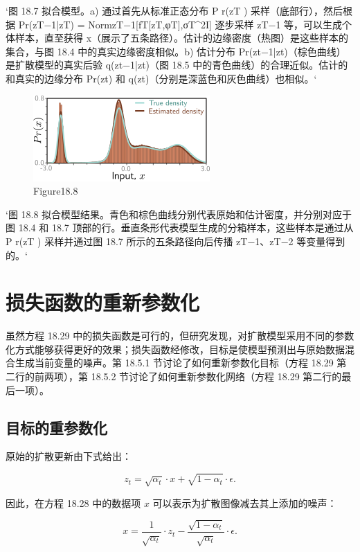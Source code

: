 `图 18.7 拟合模型。a) 通过首先从标准正态分布 P r(zT ) 采样（底部行），然后根据 Pr(zT−1|zT) = NormzT−1[fT[zT,φT],σT^2I] 逐步采样 zT−1 等，可以生成个体样本，直至获得 x（展示了五条路径）。估计的边缘密度（热图）是这些样本的集合，与图 18.4 中的真实边缘密度相似。b) 估计分布 Pr(zt−1|zt)（棕色曲线）是扩散模型的真实后验 q(zt−1|zt)（图 18.5 中的青色曲线）的合理近似。估计的和真实的边缘分布 Pr(zt) 和 q(zt)（分别是深蓝色和灰色曲线）也相似。`

\begin{figure}[h!]
\centering
\includegraphics[width=0.7\linewidth]{png/chapter18/DiffusionResultsFinal.png}
\caption{Figure18.8}
\end{figure}

`图 18.8 拟合模型结果。青色和棕色曲线分别代表原始和估计密度，并分别对应于图 18.4 和 18.7 顶部的行。垂直条形代表模型生成的分箱样本，这些样本是通过从 P r(zT ) 采样并通过图 18.7 所示的五条路径向后传播 zT−1、zT−2 等变量得到的。`

\section{损失函数的重新参数化}
虽然方程 18.29 中的损失函数是可行的，但研究发现，对扩散模型采用不同的参数化方式能够获得更好的效果；损失函数经修改，目标是使模型预测出与原始数据混合生成当前变量的噪声。第 18.5.1 节讨论了如何重新参数化目标（方程 18.29 第二行的前两项），第 18.5.2 节讨论了如何重新参数化网络（方程 18.29 第二行的最后一项）。


\subsection{目标的重参数化}
原始的扩散更新由下式给出：

\[
z_t = \sqrt{\alpha_t} \cdot x + \sqrt{1 - \alpha_t} \cdot \epsilon. \tag{18.30}
\]

因此，在方程 18.28 中的数据项 \(x\) 可以表示为扩散图像减去其上添加的噪声：

\[
x = \frac{1}{\sqrt{\alpha_t}} \cdot z_t - \frac{\sqrt{1 - \alpha_t}}{\sqrt{\alpha_t}} \cdot \epsilon. \tag{18.31}
\]

